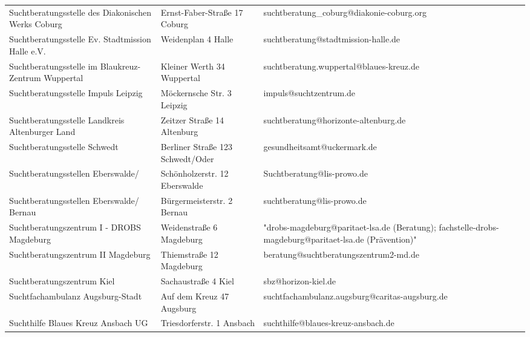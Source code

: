 {\begin{xltabular}{\textwidth} {
 >{\raggedright\arraybackslash}p{5cm}
 >{\raggedright\arraybackslash}X
 >{\raggedright\arraybackslash}p{5cm} }
Suchtberatungsstelle des Diakonischen Werks Coburg & Ernst-Faber-Straße 17 Coburg & suchtberatung\_coburg@diakonie-coburg.org \\
Suchtberatungsstelle Ev. Stadtmission Halle e.V. & Weidenplan 4 Halle & suchtberatung@stadtmission-halle.de \\
Suchtberatungsstelle im Blaukreuz-Zentrum Wuppertal & Kleiner Werth 34 Wuppertal & suchtberatung.wuppertal@blaues-kreuz.de \\
Suchtberatungsstelle Impuls Leipzig & Möckernsche Str. 3 Leipzig & impuls@suchtzentrum.de \\
Suchtberatungsstelle Landkreis Altenburger Land & Zeitzer Straße 14 Altenburg & suchtberatung@horizonte-altenburg.de \\
Suchtberatungsstelle Schwedt & Berliner Straße 123 Schwedt/Oder & gesundheitsamt@uckermark.de \\
Suchtberatungsstellen Eberswalde/ & Schönholzerstr. 12 Eberswalde & Suchtberatung@lis-prowo.de \\
Suchtberatungsstellen Eberswalde/ Bernau & Bürgermeisterstr. 2 Bernau & suchtberatung@lis-prowo.de \\
Suchtberatungszentrum I - DROBS Magdeburg & Weidenstraße 6 Magdeburg & "drobs-magdeburg@paritaet-lsa.de (Beratung); fachstelle-drobs-magdeburg@paritaet-lsa.de (Prävention)" \\
Suchtberatungszentrum II Magdeburg & Thiemstraße 12 Magdeburg & beratung@suchtberatungszentrum2-md.de \\
Suchtberatungszentrum Kiel & Sachaustraße 4 Kiel & sbz@horizon-kiel.de \\
Suchtfachambulanz Augsburg-Stadt & Auf dem Kreuz 47 Augsburg & suchtfachambulanz.augsburg@caritas-augsburg.de \\
Suchthilfe Blaues Kreuz Ansbach UG & Triesdorferstr. 1 Ansbach & suchthilfe@blaues-kreuz-ansbach.de \\

\end{xltabular}}
